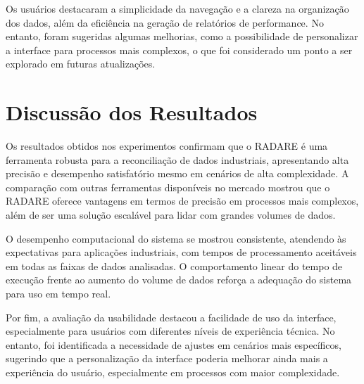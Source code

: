 Os usuários destacaram a simplicidade da navegação e a clareza na organização dos dados, além da eficiência na geração de relatórios de performance. No entanto, foram sugeridas algumas melhorias, como a possibilidade de personalizar a interface para processos mais complexos, o que foi considerado um ponto a ser explorado em futuras atualizações.

\section{Discussão dos Resultados}
\label{Sec:DiscussaoResultados}

Os resultados obtidos nos experimentos confirmam que o RADARE é uma ferramenta robusta para a reconciliação de dados industriais, apresentando alta precisão e desempenho satisfatório mesmo em cenários de alta complexidade. A comparação com outras ferramentas disponíveis no mercado mostrou que o RADARE oferece vantagens em termos de precisão em processos mais complexos, além de ser uma solução escalável para lidar com grandes volumes de dados.

O desempenho computacional do sistema se mostrou consistente, atendendo às expectativas para aplicações industriais, com tempos de processamento aceitáveis em todas as faixas de dados analisadas. O comportamento linear do tempo de execução frente ao aumento do volume de dados reforça a adequação do sistema para uso em tempo real.

Por fim, a avaliação da usabilidade destacou a facilidade de uso da interface, especialmente para usuários com diferentes níveis de experiência técnica. No entanto, foi identificada a necessidade de ajustes em cenários mais específicos, sugerindo que a personalização da interface poderia melhorar ainda mais a experiência do usuário, especialmente em processos com maior complexidade.

